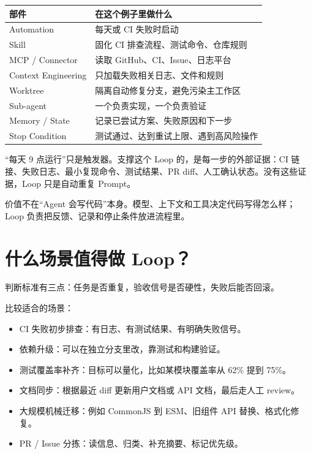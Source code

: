 \documentclass[9pt,a4paper,twocolumn]{ctexart}
\begin{document}
{\footnotesize
\begin{tabular}{|p{}|p{}|}
\hline
\textbf{部件} & \textbf{在这个例子里做什么} \\
\hline
Automation & 每天或 CI 失败时启动 \\
\hline
Skill & 固化 CI 排查流程、测试命令、仓库规则 \\
\hline
MCP / Connector & 读取 GitHub、CI、Issue、日志平台 \\
\hline
Context Engineering & 只加载失败相关日志、文件和规则 \\
\hline
Worktree & 隔离自动修复分支，避免污染主工作区 \\
\hline
Sub-agent & 一个负责实现，一个负责验证 \\
\hline
Memory / State & 记录已尝试方案、失败原因和下一步 \\
\hline
Stop Condition & 测试通过、达到重试上限、遇到高风险操作 \\
\hline
\end{tabular}
}



“每天 9 点运行”只是触发器。支撑这个 Loop 的，是每一步的外部证据：CI 链接、失败日志、最小复现命令、测试结果、PR diff、人工确认状态。没有这些证据，Loop 只是自动重复 Prompt。



价值不在“Agent 会写代码”本身。模型、上下文和工具决定代码写得怎么样；Loop 负责把反馈、记录和停止条件放进流程里。



\section*{什么场景值得做 Loop？}


判断标准有三点：任务是否重复，验收信号是否硬性，失败后能否回滚。



比较适合的场景：


\begin{itemize}[itemsep=1pt, topsep=2pt]
  \item CI 失败初步排查：有日志、有测试结果、有明确失败信号。
  \item 依赖升级：可以在独立分支里改，靠测试和构建验证。
  \item 测试覆盖率补齐：目标可以量化，比如某模块覆盖率从 62\% 提到 75\%。
  \item 文档同步：根据最近 diff 更新用户文档或 API 文档，最后走人工 review。
  \item 大规模机械迁移：例如 CommonJS 到 ESM、旧组件 API 替换、格式化修复。
  \item PR / Issue 分拣：读信息、归类、补充摘要、标记优先级。
\end{itemize}
\end{document}
